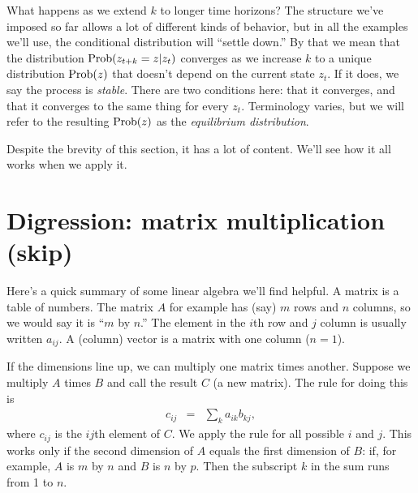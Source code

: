\documentclass[11pt]{article}
\begin{document}
What happens as we extend $k$ to longer time horizons?
The structure we've imposed so far allows a lot of different kinds
of behavior, but in all the examples we'll use,
the conditional distribution will ``settle down.''
By that we mean that the distribution $ \mbox{Prob}(z_{t+k} = z | z_t) $
converges as we increase $k$ to a unique distribution $\mbox{Prob}(z)$
that doesn't depend on the current state $z_t$.
If it does, we say the process is {\it stable\/}.
There are two conditions here:  that it converges, and that it converges
to the same thing for every $z_t$.
Terminology varies, but we will refer to the resulting $\mbox{Prob}(z)$ as the
{\it equilibrium distribution\/}.

Despite the brevity of this section, it has a lot of content.
We'll see how it all works when we apply it.


\section{Digression:  matrix multiplication (skip)}

Here's a quick summary of some linear algebra we'll find helpful.
A matrix is a table of numbers.
The matrix $A$ for example has (say) $m$ rows and $n$ columns,
so we would say it is ``$m$ by $n$.''
The element in the $i$th row and $j$ column is usually written $a_{ij}$.
A (column) vector is a matrix with one column ($n=1$).

If the dimensions line up, we can multiply
one matrix times another.
Suppose we multiply $A$ times $B$ and call the result $C$ (a new matrix).
The rule for doing this is
\begin{eqnarray*}
    c_{ij} &=& \sum_k a_{ik} b_{kj} ,
\end{eqnarray*}
where $c_{ij}$ is the $ij$th element of $C$.
We apply the rule for all possible $i$ and $j$.
This works only if the second dimension of $A$ equals the first dimension of $B$:
if, for example, $A$ is $m$ by $n$ and $B$ is $n$ by $p$.
Then the subscript $k$ in the sum runs from 1 to $n$.
\end{document}
